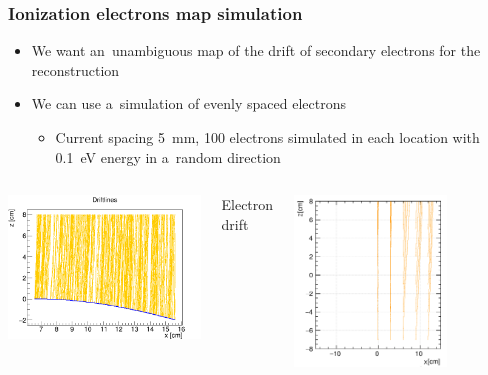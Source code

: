 \documentclass{beamer}
\begin{document}
	\begin{frame}
		\frametitle{Ionization electrons map simulation}
		\begin{itemize}
			\item We want an~unambiguous map of the drift of secondary electrons for the reconstruction
			\item We can use a~simulation of evenly spaced electrons
			\begin{itemize}
				\item Current spacing 5~mm, 100 electrons simulated in each location with 0.1~eV energy in a~random direction
			\end{itemize}
		\end{itemize}
		\begin{columns}
				\centering
				\begin{minipage}[t][4.2cm]{\textwidth}
					\centering
					\includegraphics[width = \textwidth]{../images/drift_xz.png}\\
				\end{minipage}
				{Electron drift}
				\centering
				\begin{minipage}[t][4.2cm]{\textwidth}
					\centering
					\includegraphics[width=0.7\textwidth]{../images/map_lines_flipped.png}\\

\end{minipage}
\end{columns}
\end{frame}
\end{document}
